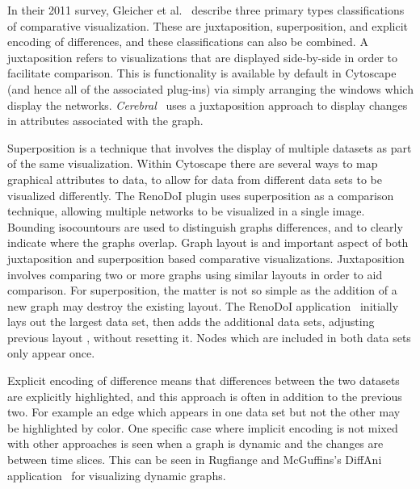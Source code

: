 \documentclass[twocolumn]{bmcart}%
\begin{document}
In their 2011 survey, Gleicher et al.~\cite{Gleicher2011} describe three primary types classifications of comparative visualization.
These are juxtaposition, superposition, and explicit encoding of differences, and these classifications can also be combined.
A juxtaposition refers to visualizations that are displayed side-by-side in order to facilitate comparison.
This is functionality is available by default in Cytoscape (and hence all of the associated plug-ins) via simply arranging the windows which display the networks.
\textit{Cerebral}~\cite{Barsky2008cerebral} uses a juxtaposition approach to display changes in attributes associated with the graph.

Superposition is a technique that involves the display of multiple datasets as part of the same visualization.
Within Cytoscape there are several ways to map graphical attributes to data, to allow for data from different data sets to be visualized differently.
The RenoDoI plugin uses superposition as a comparison technique, allowing multiple networks to be visualized in a single image. Bounding isocountours are used to distinguish graphs differences, and to clearly indicate where the graphs overlap.
Graph layout is and important aspect of both juxtaposition and superposition based comparative visualizations.
Juxtaposition involves comparing two or more graphs using similar layouts in order to aid comparison.
For superposition, the matter is not so simple as the addition of a new graph may destroy the existing layout.
The RenoDoI application~\cite{Vehlow2015} initially lays out the largest data set, then adds the additional data sets, adjusting previous layout , without resetting it.
Nodes which are included in both data sets only appear once.

Explicit encoding of difference means that differences between the two datasets are explicitly highlighted, and this approach is often in addition to the previous two. For example an edge which appears in one data set but not the other may be highlighted by color.
One specific case where implicit encoding is not mixed with other approaches is seen when a graph is dynamic and the changes are between time slices.
This can be seen in Rugfiange and McGuffins's DiffAni application~\cite{Rufiange2013} for visualizing dynamic graphs.


\ \\ \
\end{document}
